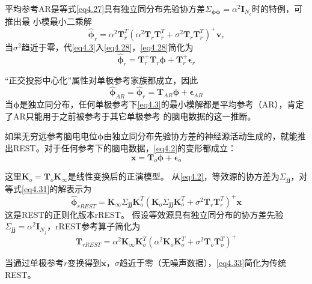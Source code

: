 平均参考AR是等式\eqref{eq4.27}具有独立同分布先验协方差$\Sigma_{\mathbf{\phi\phi}}=\alpha^2\mathbf{I}_{N_c}$时的特例，可推出最
小模最小二乘解
\begin{equation}\label{eq4.28}
\hat{\mathbf{\phi}}_r=\alpha^2\mathbf{T}_r^T(\alpha^2\mathbf{T}_r\mathbf{T}_r^T+\sigma^2\mathbf{T}_r\mathbf{T}_r^T)^+\mathbf{v}_r
\end{equation}
当$\sigma^2$趋近于零，代\eqref{eq4.3}入\eqref{eq4.28}，\eqref{eq4.28}简化为
\begin{equation}\label{eq4.29}
\hat{\mathbf{\phi}}_r=\mathbf{T}_r^+\mathbf{T}_r\mathbf{\phi}+\mathbf{T}_r^+\mathbf{\epsilon}_r
\end{equation}

“正交投影中心化”属性对单极参考家族都成立，因此
\begin{equation}\label{eq4.30}
\hat{\mathbf{\phi}}_{AR}=\hat{\mathbf{\phi}}_r=\mathbf{T}_{AR}\mathbf{\phi}+\mathbf{\epsilon}_{AR}
\end{equation}
当$\mathbf{\phi}$是独立同分布，任何单极参考下\eqref{eq4.3}的最小模解都是平均参考（AR），肯定了AR只能用于之前被参考于其它单极参考
的脑电数据的这一推断。

如果无穷远参考脑电电位$\mathbf{\phi}$由独立同分布先验协方差的神经源活动生成的，就能推出REST。对于任何参考下的脑电数据，\eqref{eq4.2}的变形都成立：
\begin{equation}\label{eq4.31}
\mathbf{x}=\mathbf{T}_o\mathbf{\phi}+\mathbf{\epsilon}_o
\end{equation}


这里$\mathbf{K}_o=\mathbf{T}_o\mathbf{K}_{\infty}$是线性变换后的正演模型。 从\eqref{eq4.2}，等效源的协方差为$\Sigma_{\mathbf{jj}}$，对等式\eqref{eq4.31}的解表示为
\begin{equation}\label{eq4.32}
\hat{\mathbf{\phi}}_{rREST}=\mathbf{K}_{\infty}\Sigma_{\mathbf{jj}}\mathbf{K}_o^T(\mathbf{K}_o\Sigma_{\mathbf{jj}}\mathbf{K}_o^T+\sigma^2\mathbf{T}_r\mathbf{T}_r^T)^+\mathbf{x}
\end{equation}
这是REST的正则化版本rREST。 假设等效源具有独立同分布的协方差先验$\Sigma_\mathbf{jj}=\alpha^2\mathbf{I}_{N_j}$，rREST参考算子简化为
\begin{equation}\label{eq4.33}
\mathbf{T}_{rREST}=\alpha^2\mathbf{K}_{\infty}\mathbf{K}_o^T(\alpha^2\mathbf{K}_o\mathbf{K}_o^T+\sigma^2\mathbf{T}_o\mathbf{T}_o^T)^+
\end{equation}

当通过单极参考$r$变换得到$\mathbf{x}$，$\sigma$趋近于零（无噪声数据），\eqref{eq4.33}简化为传统REST。

